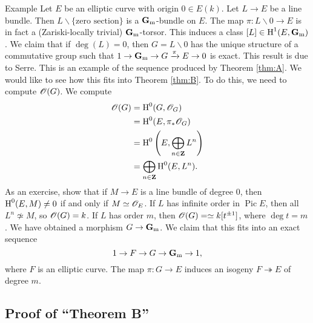 \begin{enonce}{Example}
Let $E$ be an elliptic curve with origin $0\in E(k)$. Let $L\to E$ be a line 
bundle. Then $L\smallsetminus \{\text{zero section}\}$ is a $\mathbf{G}_{\mathrm{m}}$-bundle 
on $E$. The map $\pi:L\smallsetminus0 \to E$ is in fact a (Zariski-locally 
trivial) $\mathbf{G}_{\mathrm{m}}$-torsor. This induces a class $[L]\in \operatorname{H}^1(E,\mathbf{G}_{\mathrm{m}})$. 
We claim that if $\deg(L)=0$, then $G=L\smallsetminus 0$ has the unique structure 
of a commutative group such that $1 \to \mathbf{G}_{\mathrm{m}} \to G \xrightarrow\pi E \to 0$ 
is exact. This result is due to Serre. This is an example of the sequence produced 
by Theorem \ref{thm:A}. We would like to see how this fits into Theorem 
\ref{thm:B}. To do this, we need to compute $\mathscr{O}(G)$. We compute 
\begin{align*}
  \mathscr{O}(G) &= \operatorname{H}^0(G,\mathscr{O}_G) \\
    &= \operatorname{H}^0(E,\pi_\ast \mathscr{O}_G) \\
    &= \operatorname{H}^0\left(E,\bigoplus_{n\in \mathbf{Z}} L^n\right) \\
    &= \bigoplus_{n\in \mathbf{Z}} \operatorname{H}^0(E,L^n) .
\end{align*}
As an exercise, show that if $M\to E$ is a line bundle of degree $0$, then 
$\operatorname{H}^0(E,M)\ne 0$ if and only if $M\simeq \mathscr{O}_E$. If $L$ has infinite order 
in $\operatorname{Pic} E$, then all $L^n\not\simeq M$, so $\mathscr{O}(G)=k$. If 
$L$ has order $m$, then $\mathscr{O}(G)=\simeq k[t^{\pm 1}]$, where 
$\deg t=m$. We have obtained a morphism $G\to \mathbf{G}_{\mathrm{m}}$. We claim that this 
fits into an exact sequence 
\[
  1 \to F \to G \to \mathbf{G}_{\mathrm{m}} \to 1 ,
\]
where $F$ is an elliptic curve. The map $\pi:G\to E$ induces an isogeny 
$F\twoheadrightarrow E$ of degree $m$. 
\end{enonce}





\subsection{Proof of ``Theorem B''}

